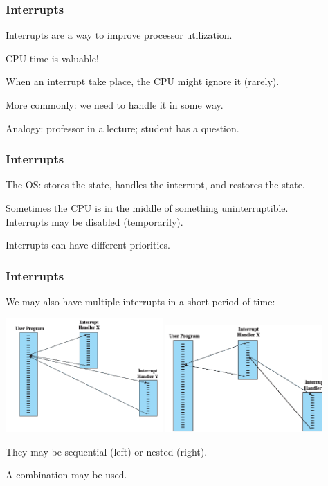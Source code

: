 \begin{frame}
\frametitle{Interrupts}
Interrupts are a way to improve processor utilization.

CPU time is valuable!

When an interrupt take place, the CPU might ignore it (rarely).

More commonly: we need to \alert{handle} it in some way.

Analogy: professor in a lecture; student has a question.


\end{frame}

\begin{frame}
\frametitle{Interrupts}
The OS: stores the state, handles the interrupt, and restores the state.

Sometimes the CPU is in the middle of something uninterruptible.\\
\quad Interrupts may be disabled (temporarily).

Interrupts can have different priorities.
\end{frame}

\begin{frame}
\frametitle{Interrupts}

We may also have multiple interrupts in a short period of time:

\begin{center}
\includegraphics[width=0.45\textwidth]{images/interrupts-sequential.png}
\includegraphics[width=0.45\textwidth]{images/interrupts-nested.png}
\end{center}

They may be sequential (left) or nested (right).

A combination may be used.


\end{frame}

